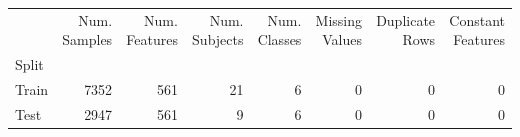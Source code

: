 \begin{tabular}{lrrrrrrr}
\toprule
 & Num. Samples & Num. Features & Num. Subjects & Num. Classes & Missing Values & Duplicate Rows & Constant Features \\
Split &  &  &  &  &  &  &  \\
\midrule
Train & 7352 & 561 & 21 & 6 & 0 & 0 & 0 \\
Test & 2947 & 561 & 9 & 6 & 0 & 0 & 0 \\
\bottomrule
\end{tabular}

